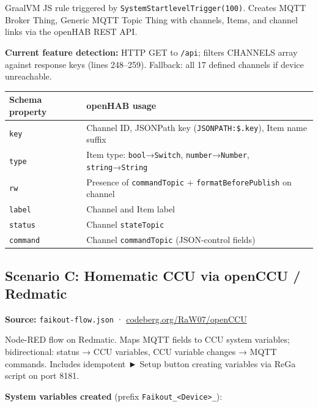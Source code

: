 \documentclass[11pt,a4paper]{article}
\begin{document}
GraalVM JS rule triggered by \texttt{SystemStartlevelTrigger(100)}. Creates MQTT Broker Thing, Generic MQTT Topic Thing with channels, Items, and channel links via the openHAB REST API.

\textbf{Current feature detection:} HTTP GET to \texttt{/api}; filters CHANNELS array against response keys (lines 248–259). Fallback: all 17 defined channels if device unreachable.

\begin{tabular}{@{}ll@{}}
\toprule
\textbf{Schema property} & \textbf{openHAB usage} \\
\midrule
\rowcolor{lightbg}
\texttt{key}    & Channel ID, JSONPath key (\texttt{JSONPATH:\$.key}), Item name suffix \\
\texttt{type}   & Item type: \texttt{bool}→\texttt{Switch}, \texttt{number}→\texttt{Number}, \texttt{string}→\texttt{String} \\
\rowcolor{lightbg}
\texttt{rw}     & Presence of \texttt{commandTopic} + \texttt{formatBeforePublish} on channel \\
\texttt{label}  & Channel and Item label \\
\rowcolor{lightbg}
\texttt{status} & Channel \texttt{stateTopic} \\
\texttt{command}& Channel \texttt{commandTopic} (JSON-control fields) \\
\bottomrule
\end{tabular}

\subsection{Scenario C: Homematic CCU via openCCU / Redmatic}

\textbf{Source:} \texttt{faikout-flow.json} · \href{https://codeberg.org/RaW07/openCCU}{codeberg.org/RaW07/openCCU}

Node-RED flow on Redmatic. Maps MQTT fields to CCU system variables; bidirectional: status → CCU variables, CCU variable changes → MQTT commands. Includes idempotent ► Setup button creating variables via ReGa script on port 8181.

\textbf{System variables created} (prefix \texttt{Faikout\_\textless Device\textgreater\_}):
\end{document}
